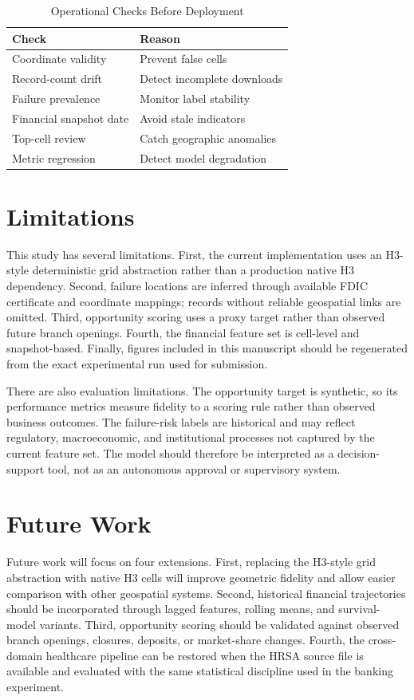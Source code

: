 \documentclass[conference]{IEEEtran}
\begin{document}
\begin{table}[t]
\caption{Operational Checks Before Deployment}
\label{tab:deployment_checks}
\centering
\begin{tabular}{ll}
\toprule
Check & Reason \\
\midrule
Coordinate validity & Prevent false cells \\
Record-count drift & Detect incomplete downloads \\
Failure prevalence & Monitor label stability \\
Financial snapshot date & Avoid stale indicators \\
Top-cell review & Catch geographic anomalies \\
Metric regression & Detect model degradation \\
\bottomrule
\end{tabular}
\end{table}

\section{Limitations}
This study has several limitations. First, the current implementation uses
an H3-style deterministic grid abstraction rather than a production native
H3 dependency. Second, failure locations are inferred through available FDIC
certificate and coordinate mappings; records without reliable geospatial
links are omitted. Third, opportunity scoring uses a proxy target rather
than observed future branch openings. Fourth, the financial feature set is
cell-level and snapshot-based. Finally, figures included in this manuscript
should be regenerated from the exact experimental run used for submission.

There are also evaluation limitations. The opportunity target is synthetic,
so its performance metrics measure fidelity to a scoring rule rather than
observed business outcomes. The failure-risk labels are historical and may
reflect regulatory, macroeconomic, and institutional processes not captured
by the current feature set. The model should therefore be interpreted as a
decision-support tool, not as an autonomous approval or supervisory system.

\section{Future Work}
Future work will focus on four extensions. First, replacing the H3-style
grid abstraction with native H3 cells will improve geometric fidelity and
allow easier comparison with other geospatial systems. Second, historical
financial trajectories should be incorporated through lagged features,
rolling means, and survival-model variants. Third, opportunity scoring
should be validated against observed branch openings, closures, deposits,
or market-share changes. Fourth, the cross-domain healthcare pipeline can
be restored when the HRSA source file is available and evaluated with the
same statistical discipline used in the banking experiment.
\end{document}
